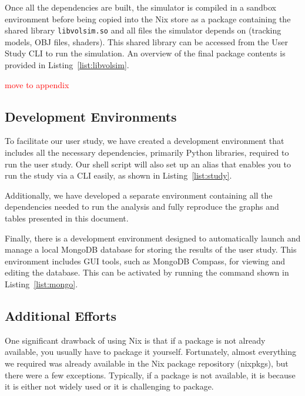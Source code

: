 Once all the dependencies are built, the simulator is compiled in a sandbox environment before being copied into the Nix store as a package containing the shared library \texttt{libvolsim.so} and all files the simulator depends on (tracking models, OBJ files, shaders). This shared library can be accessed from the User Study CLI to run the simulation. An overview of the final package contents is provided in Listing~\ref{list:libvolsim}.

\textcolor{red}{move to appendix}

\subsection{Development Environments}

To facilitate our user study, we have created a development environment that includes all the necessary dependencies, primarily Python libraries, required to run the user study. Our shell script will also set up an alias that enables you to run the study via a CLI easily, as shown in Listing~\ref{list:study}.


Additionally, we have developed a separate environment containing all the dependencies needed to run the analysis and fully reproduce the graphs and tables presented in this document. 

Finally, there is a development environment designed to automatically launch and manage a local MongoDB database for storing the results of the user study. This environment includes GUI tools, such as MongoDB Compass, for viewing and editing the database. This can be activated by running the command shown in Listing~\ref{list:mongo}.


\subsection{Additional Efforts}

One significant drawback of using Nix is that if a package is not already available, you usually have to package it yourself. Fortunately, almost everything we required was already available in the Nix package repository (nixpkgs), but there were a few exceptions. Typically, if a package is not available, it is because it is either not widely used or it is challenging to package.

